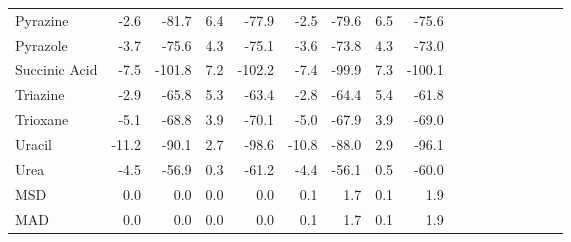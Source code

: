 \begin{table}[h]
\begin{tabular}{lrrrrrrrrrrrrrrrr}
Pyrazine & -2.6 & -81.7 & 6.4 & -77.9 & -2.5 & -79.6 & 6.5 & -75.6 \\
Pyrazole & -3.7 & -75.6 & 4.3 & -75.1 & -3.6 & -73.8 & 4.3 & -73.0 \\
Succinic Acid & -7.5 & -101.8 & 7.2 & -102.2 & -7.4 & -99.9 & 7.3 & -100.1 \\
Triazine & -2.9 & -65.8 & 5.3 & -63.4 & -2.8 & -64.4 & 5.4 & -61.8 \\
Trioxane & -5.1 & -68.8 & 3.9 & -70.1 & -5.0 & -67.9 & 3.9 & -69.0 \\
Uracil & -11.2 & -90.1 & 2.7 & -98.6 & -10.8 & -88.0 & 2.9 & -96.1 \\
Urea & -4.5 & -56.9 & 0.3 & -61.2 & -4.4 & -56.1 & 0.5 & -60.0 \\
MSD & 0.0 & 0.0 & 0.0 & 0.0 & 0.1 & 1.7 & 0.1 & 1.9 \\
MAD & 0.0 & 0.0 & 0.0 & 0.0 & 0.1 & 1.7 & 0.1 & 1.9 \\
\bottomrule
\end{tabular}

\end{table}